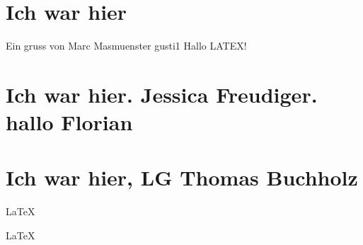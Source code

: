 \documentclass{article}
\begin{document}
\section{Ich war hier}
Ein gruss von Marc Masmuenster gusti1
Hallo LATEX!  
\section{Ich war hier. Jessica Freudiger. hallo Florian}
\section{Ich war hier, LG Thomas Buchholz}
\LaTeX 

\huge
\LaTeX 
   
\end{document}
